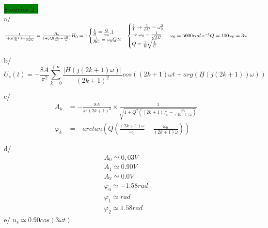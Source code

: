 \documentclass[a4paper,twocolumn,landscape]{article}
\begin{document}
\noindent
\colorbox{green}{Exercice 2 :} \\

\noindent
a/ \begin{math}
    \frac{1}{1+j(\frac{\omega}{R}L) - \frac{1}{R\omega C}} = \frac{H_0}{1 + jQ(\frac{\omega}{\omega_0} - \frac{\omega_0}{\omega})}\\
    H_0 = 1\\
    \begin{cases}
        \frac{L}{R} = \frac{Q}{\omega_0}.1\\
        \frac{1}{RC} = \omega_0  Q . 2\\
    \end{cases}
    \begin{cases}
        \frac{2}{1} \to \frac{1}{LC} = \omega_0^2\\
        \Rightarrow \omega_0 = \frac{1}{\sqrt{LC}}\\
        Q = \frac{1}{R}\sqrt{\frac{L}{C}}
    \end{cases}\\
    \omega_0 = 5000rad.s^{-1}\\
    Q = 100 \\
    \omega_0 = 3\omega
\end{math}

\noindent b/ 
\begin{equation*}
    U_s(t) = -\frac{8A}{\pi^2} \sum_{k=0}^{+\infty} \frac{|H(j(2k+1)\omega)|}{(2k+1)^2}cos((2k+1)\omega t + arg(\underline{H}(j(2k+1))\omega))
\end{equation*}

\noindent
c/ \begin{align*}
    A_k &= -\frac{8A}{\pi^2(2k+1)^2} \times \frac{1}{\sqrt{1+Q^2((2k+1)\frac{\omega}{\omega_0}-\frac{\omega_0}{(2k+1)\omega})}}\\
    \varphi_k &= -arctan(Q(\frac{(2k+1)\omega}{\omega_0} - \frac{\omega_0}{(2k+1)\omega}))
\end{align*}

\noindent
d/ \begin{eqnarray*}
    A_0 \simeq 0,03 V\\
    A_1 \simeq  0.90V\\
    A_2 \simeq  0.0V\\
    \varphi_0 \simeq  -1.58 rad\\
    \varphi_1 \simeq  rad\\
    \varphi_2 \simeq  1.58 rad
\end{eqnarray*}
\noindent
e/ \(u_s \simeq 0.90cos(3\omega t)\)\\
\end{document}
